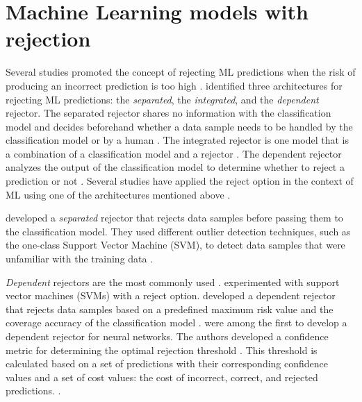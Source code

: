 \section{Machine Learning models with rejection}
\label{sec:related-work-rejection}
Several studies promoted the concept of rejecting ML predictions when the risk of producing an incorrect prediction is too high \citep{sayin2021science, hendrickx2021machine, woo2020future}.
%
\citet{hendrickx2021machine} identified three architectures for rejecting ML predictions: the \emph{separated}, the \emph{integrated}, and the \emph{dependent} rejector.
%
The separated rejector shares no information with the classification model and decides beforehand whether a data sample needs to be handled by the classification model or by a human \citep{hendrickx2021machine}.
%
The integrated rejector is one model that is a combination of a classification model and a rejector \citep{hendrickx2021machine}.
%
The dependent rejector analyzes the output of the classification model to determine whether to reject a prediction or not \citep{hendrickx2021machine}.
%
Several studies have applied the reject option in the context of ML using one of the architectures mentioned above \citep{coenen2020probability, grandvalet2008reject, nadeem2009reject, Geifman2017Selective, geifman2019reject}.
%

%
\citet{coenen2020probability} developed a \emph{separated} rejector that rejects data samples before passing them to the classification model.
%
They used different outlier detection techniques, such as the one-class Support Vector Machine (SVM), to detect data samples that were unfamiliar with
the training data  \citep{coenen2020probability}.
%

%
\emph{Dependent} rejectors are the most commonly used \citep{Geifman2017Selective, de2000reject, grandvalet2008reject}.
%
\citet{grandvalet2008reject} experimented with support vector machines (SVMs) with a reject option.
%
\citet{Geifman2017Selective} developed a dependent rejector that rejects data samples based on a predefined maximum risk value and the coverage accuracy of the classification model \citep{Geifman2017Selective}.
%
\citet{de2000reject} were among the first to develop a dependent rejector for neural networks.
%
The authors developed a confidence metric for determining the optimal rejection threshold \citep{de2000reject}.
%
This threshold is calculated based on a set of predictions with their corresponding confidence values and a set of cost values: the cost of incorrect, correct, and rejected predictions. \citep{de2000reject}.
%

